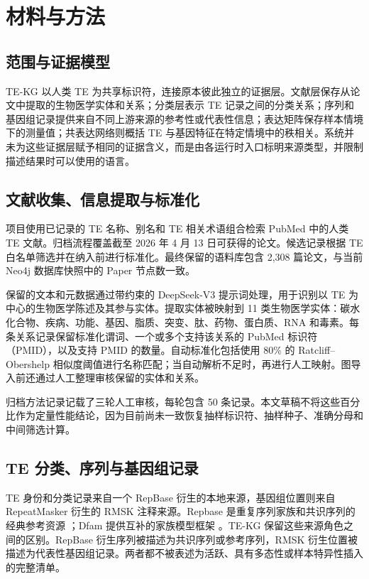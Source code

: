 \section{材料与方法}

\subsection{范围与证据模型}

TE-KG 以人类 TE 为共享标识符，连接原本彼此独立的证据层。文献层保存从论文中提取的生物医学实体和关系；分类层表示 TE 记录之间的分类关系；序列和基因组记录提供来自不同上游来源的参考性或代表性信息；表达矩阵保存样本情境下的测量值；共表达网络则概括 TE 与基因特征在特定情境中的秩相关。系统并未为这些证据层赋予相同的证据含义，而是由各运行时入口标明来源类型，并限制描述结果时可以使用的语言。

\subsection{文献收集、信息提取与标准化}

项目使用已记录的 TE 名称、别名和 TE 相关术语组合检索 PubMed 中的人类 TE 文献。归档流程覆盖截至 2026 年 4 月 13 日可获得的论文。候选记录根据 TE 白名单筛选并在纳入前进行标准化。最终保留的语料库包含 2,308 篇论文，与当前 Neo4j 数据库快照中的 Paper 节点数一致。

保留的文本和元数据通过带约束的 DeepSeek-V3 提示词处理，用于识别以 TE 为中心的生物医学陈述及其参与实体。提取实体被映射到 11 类生物医学实体：碳水化合物、疾病、功能、基因、脂质、突变、肽、药物、蛋白质、RNA 和毒素。每条关系记录保留标准化谓词、一个或多个支持该关系的 PubMed 标识符（PMID），以及支持 PMID 的数量。自动标准化包括使用 80\% 的 Ratcliff--Obershelp 相似度阈值进行名称匹配；当自动解析不足时，再进行人工映射。图导入前还通过人工整理审核保留的实体和关系。

归档方法记录记载了三轮人工审核，每轮包含 50 条记录。本文草稿不将这些百分比作为定量性能结论，因为目前尚未一致恢复抽样标识符、抽样种子、准确分母和中间筛选计算。

\subsection{TE 分类、序列与基因组记录}

TE 身份和分类记录来自一个 RepBase 衍生的本地来源，基因组位置则来自 RepeatMasker 衍生的 RMSK 注释来源。Repbase 是重复序列家族和共识序列的经典参考资源 \citep{Bao2015Repbase,Kojima2018HumanRepbase}；Dfam 提供互补的家族模型框架 \citep{Wheeler2013Dfam}。TE-KG 保留这些来源角色之间的区别。RepBase 衍生序列被描述为共识序列或参考序列，RMSK 衍生位置被描述为代表性基因组记录。两者都不被表述为活跃、具有多态性或样本特异性插入的完整清单。

